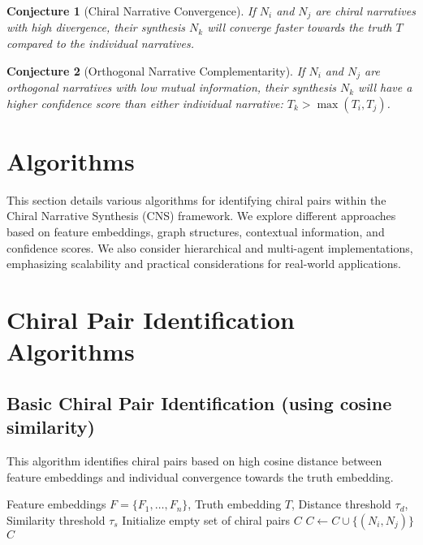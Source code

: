 \documentclass[12pt, a4paper]{article}
\newtheorem{conjecture}{Conjecture}
\begin{document}
\begin{conjecture}[Chiral Narrative Convergence]
If $N_i$ and $N_j$ are chiral narratives with high divergence, their synthesis $N_k$ will converge faster towards the truth $T$ compared to the individual narratives.
\end{conjecture}

\begin{conjecture}[Orthogonal Narrative Complementarity]
If $N_i$ and $N_j$ are orthogonal narratives with low mutual information, their synthesis $N_k$ will have a higher confidence score than either individual narrative: $T_k > \max(T_i, T_j)$.
\end{conjecture}











\section{Algorithms}
This section details various algorithms for identifying chiral pairs within the Chiral Narrative Synthesis (CNS) framework. We explore different approaches based on feature embeddings, graph structures, contextual information, and confidence scores.  We also consider hierarchical and multi-agent implementations, emphasizing scalability and practical considerations for real-world applications.

\section{Chiral Pair Identification Algorithms}

\subsection{Basic Chiral Pair Identification (using cosine similarity)}

This algorithm identifies chiral pairs based on high cosine distance between feature embeddings and individual convergence towards the truth embedding.

\begin{algorithm}[H]
\caption{Basic Chiral Pair Identification}
\begin{algorithmic}[1]
\Require Feature embeddings $F = \{F_1, \dots, F_n\}$, Truth embedding $T$, Distance threshold $\tau_d$, Similarity threshold $\tau_s$
\State Initialize empty set of chiral pairs $C$
        \State $C \gets C \cup \{(N_i, N_j)\}$
    \EndIf
\EndFor
\Return $C$
\end{algorithmic}
\end{algorithm}
\end{document}

